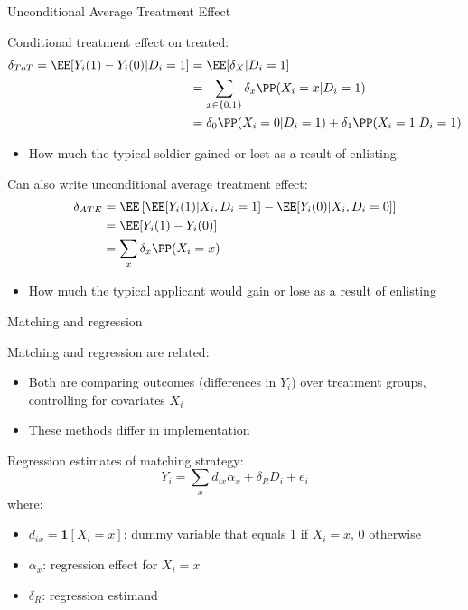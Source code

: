 \documentclass[compress, 8pt]{beamer}
\begin{document}
\begin{frame}{Unconditional Average Treatment Effect}

Conditional treatment effect on treated:
\begin{align*}
    \delta_{ToT} = \EE [Y_i (1) - Y_i(0) \vert D_i = 1] &= \EE [\delta_X \vert D_i = 1] \\
    &= \sum_{x \in \{0, 1\}} \delta_x \PP(X_i = x \vert D_i = 1 ) \\
    &= \delta_0 \PP (X_i = 0 \vert D_i = 1)
    + \delta_1 \PP (X_i = 1 \vert D_i = 1)
\end{align*}
\begin{itemize}
    \item How much the typical soldier gained or lost as a result of enlisting
\end{itemize}

\vspace{2ex}
Can also write unconditional average treatment effect:
\begin{align*}
    \delta_{ATE} &= \EE \left[ 
        \EE [Y_i (1) \vert X_i, D_i = 1]
        - \EE [Y_i(0) \vert X_i, D_i = 0]
    \right] \\
    &= \EE [Y_i (1) - Y_i(0)] \\
    &= \sum_x \delta_x \PP(X_i = x)
\end{align*}
\begin{itemize}
    \item How much the typical applicant would gain or lose as a result of enlisting
\end{itemize}

\end{frame}





\begin{frame}{Matching and regression}

Matching and regression are related:
\begin{itemize}
    \item Both are comparing outcomes (differences in $Y_i$) over treatment groups, controlling for covariates $X_i$
    \item These methods differ in implementation
\end{itemize}
Regression estimates of matching strategy:
\begin{equation*}
    Y_i = \sum_x d_{ix} \alpha_x + \delta_R D_i + e_i
\end{equation*}
where:
\begin{itemize}
    \item $d_{ix} = \mathbf{1} [X_i = x]$: dummy variable that equals 1 if $X_i = x$, 0 otherwise
    \item $\alpha_x$: regression effect for $X_i = x$
    \item $\delta_R$: regression estimand
\end{itemize}

\end{frame}
\end{document}
